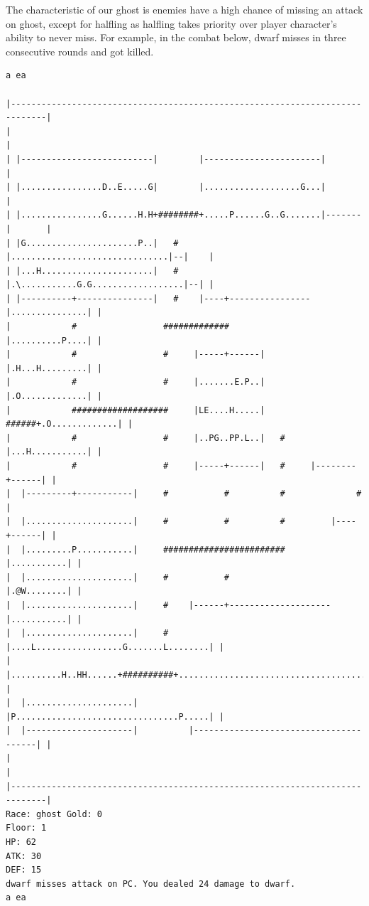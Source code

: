 \documentclass[11pt]{article}
\theoremstyle{plain}
\begin{document}
The characteristic of our ghost is enemies have a high chance of missing
an attack on ghost, except for halfling as halfling takes priority over player
character’s ability to never miss. For example, in the combat below, 
dwarf misses in three consecutive rounds and got killed.
\begin{Verbatim}[fontsize=\scriptsize]
a ea

|-----------------------------------------------------------------------------|
|                                                                             |
| |--------------------------|        |-----------------------|               |
| |................D..E.....G|        |...................G...|               |
| |................G......H.H+########+.....P......G..G.......|-------|       |
| |G......................P..|   #    |...............................|--|    |
| |...H......................|   #    |.\...........G.G..................|--| |
| |----------+---------------|   #    |----+----------------|...............| |
|            #                 #############                |..........P....| |
|            #                 #     |-----+------|         |.H...H.........| |
|            #                 #     |.......E.P..|         |.O.............| |
|            ###################     |LE....H.....|   ######+.O.............| |
|            #                 #     |..PG..PP.L..|   #     |...H...........| |
|            #                 #     |-----+------|   #     |--------+------| |
|  |---------+-----------|     #           #          #              #        |
|  |.....................|     #           #          #         |----+------| |
|  |.........P...........|     ########################         |...........| |
|  |.....................|     #           #                    |.@W........| |
|  |.....................|     #    |------+--------------------|...........| |
|  |.....................|     #    |....L.................G.......L........| |
|  |..........H..HH......+##########+.......................................| |
|  |.....................|          |P................................P.....| |
|  |---------------------|          |---------------------------------------| |
|                                                                             |
|-----------------------------------------------------------------------------|
Race: ghost Gold: 0                                                    Floor: 1
HP: 62
ATK: 30
DEF: 15
dwarf misses attack on PC. You dealed 24 damage to dwarf. 
a ea


\end{Verbatim}
\end{document}
